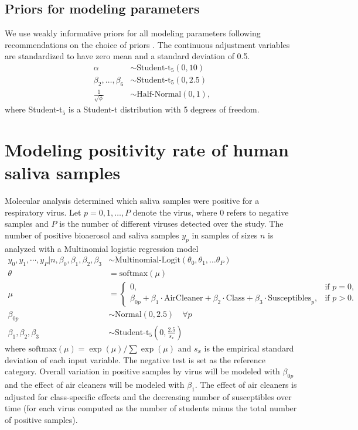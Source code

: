 \documentclass[fleqn,11pt]{wlscirep_supp}
\begin{document}
\subsection{Priors for modeling parameters}

We use weakly informative priors for all modeling parameters following recommendations on the choice of priors \cite{Gelman2008StatMed,Gelman2008StatAnnals,Gelman2020RegOther,Stan2020Priors,Gabry2023Priors}. The continuous adjustment variables are standardized to have zero mean and a standard deviation of 0.5. 
\begin{align*}
    \alpha &\sim \text{Student-t}_5(0, 10) \\
    \beta_2, \dots, \beta_6 &\sim \text{Student-t}_5(0, 2.5) \\
    \frac{1}{\sqrt{\phi}} &\sim \text{Half-Normal}(0,1),
\end{align*}
where Student-t$_5$ is a Student-t distribution with 5 degrees of freedom. 

\clearpage

\section{Modeling positivity rate of human saliva samples}\label{sec:multinomial-model}

Molecular analysis determined which saliva samples were positive for a respiratory virus. Let $p = 0, 1, \dots, P$ denote the virus, where $0$ refers to negative samples and $P$ is the number of different viruses detected over the study. The number of positive bioaerosol and saliva samples $y_p$ in samples of sizes $n$ is analyzed with a Multinomial logistic regression model
\begin{align*}
    y_0, y_1, \cdots, y_P | n, \beta_0, \beta_1, \beta_2, \beta_3 &\sim \text{Multinomial-Logit}(\theta_0, \theta_1, \dots \theta_P) \\
    \theta &= \text{softmax}(\mu) \\
    \mu &= \begin{cases}
                0, & \text{if } p=0, \\
                \beta_{0p} + \beta_{1} \cdot \text{AirCleaner} + \beta_2 \cdot \text{Class} + \beta_3 \cdot \text{Susceptibles}_p, & \text{if } p>0.
            \end{cases} \\
    \beta_{0p} &\sim \text{Normal}(0, 2.5) \quad \forall p \\
    \beta_1, \beta_2, \beta_3 &\sim \text{Student-t}_5\left(0, \frac{2.5}{s_{x}}\right) 
\end{align*}
where $\text{softmax}(\mu) = \exp(\mu)/\sum\exp(\mu)$ and $s_{x}$ is the empirical standard deviation of each input variable.  The negative test is set as the reference category. Overall variation in positive samples by virus will be modeled with $\beta_{0p}$ and the effect of air cleaners will be modeled with $\beta_1$. The effect of air cleaners is adjusted for class-specific effects and the decreasing number of susceptibles over time (for each virus computed as the number of students minus the total number of positive samples).
\end{document}
